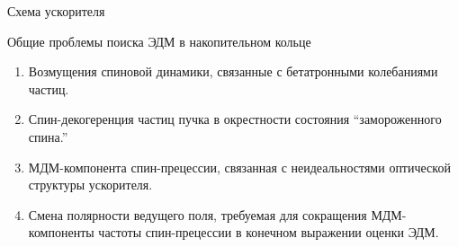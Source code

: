 \documentclass[14pt]{beamer}
\begin{document}
\begin{frame}{Схема ускорителя}
	\centering
\end{frame}

\begin{frame}{Общие проблемы поиска ЭДМ в накопительном кольце}
	\begin{enumerate}
		\item Возмущения спиновой динамики, связанные с бетатронными колебаниями частиц.
		\item Спин-декогеренция частиц пучка в окрестности состояния ``замороженного спина.''
		\item МДМ-компонента спин-прецессии, связанная с неидеальностями оптической структуры ускорителя.
		\item Смена полярности ведущего поля, требуемая для сокращения МДМ-компоненты частоты спин-прецессии в конечном выражении оценки ЭДМ.
	\end{enumerate}
\end{frame}
\end{document}
